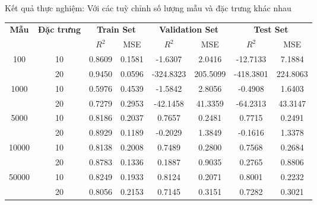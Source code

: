 \begin{frame}{Kết quả thực nghiệm: Với các tuỳ chỉnh số lượng mẫu và đặc trưng khác nhau}
\begin{table}[h!]
\centering
\setlength{\tabcolsep}{6pt}
\begin{tabular}{cccccccc}
\toprule
\textbf{Mẫu} & \textbf{Đặc trưng} & \multicolumn{2}{c}{\textbf{Train Set}} & \multicolumn{2}{c}{\textbf{Validation Set}} & \multicolumn{2}{c}{\textbf{Test Set}} \\
\cmidrule(lr){3-4}\cmidrule(lr){5-6}\cmidrule(lr){7-8}
 & & $R^2$ & MSE & $R^2$ & MSE & $R^2$ & MSE \\
\midrule
\multirow{2}{*}{100} & 10 & 0.8609 & 0.1581 & -1.6307 & 2.0416 & -12.7133 & 7.1884 \\
                     & 20 & 0.9450 & 0.0596 & -324.8323 & 205.5099 & -418.3801 & 224.8063 \\
\midrule
\multirow{2}{*}{1000} & 10 & 0.5976 & 0.4539 & -1.5842 & 2.8056 & -0.4908 & 1.6403 \\
                      & 20 & 0.7279 & 0.2953 & -42.1458 & 41.3359 & -64.2313 & 43.3147 \\
\midrule
\multirow{2}{*}{5000} & 10 & 0.8186 & 0.2037 & 0.7657 & 0.2481 & 0.7715 & 0.2491 \\
                      & 20 & 0.8929 & 0.1189 & -0.2029 & 1.3849 & -0.1616 & 1.3378 \\
\midrule
\multirow{2}{*}{10000} & 10 & 0.8138 & 0.2008 & 0.7489 & 0.2800 & 0.7568 & 0.2684 \\
                       & 20 & 0.8783 & 0.1336 & 0.1887 & 0.9035 & 0.2765 & 0.8806 \\
\midrule
\multirow{2}{*}{50000} & 10 & 0.8249 & 0.1933 & 0.8124 & 0.2071 & 0.8001 & 0.2232 \\
                       & 20 & 0.8056 & 0.2153 & 0.7145 & 0.3151 & 0.7282 & 0.3021 \\
\bottomrule
\end{tabular}
\label{tab:performance_grouped_samples_features}
\end{table}
\end{frame}

